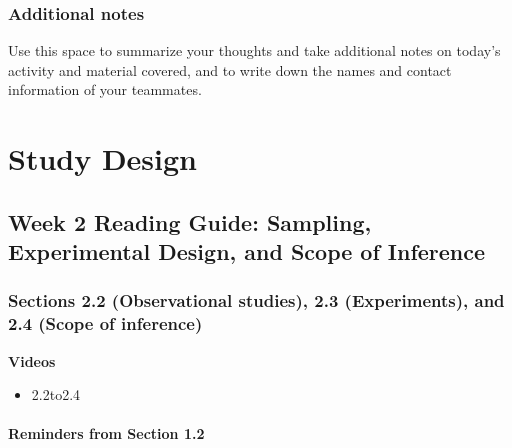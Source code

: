 \documentclass[
]{report}
\providecommand{\tightlist}{%
  \setlength{\itemsep}{0pt}\setlength{\parskip}{0pt}}
\begin{document}
\hypertarget{additional-notes}{%
\subsection{Additional notes}\label{additional-notes}}

Use this space to summarize your thoughts and take additional notes on today's activity and material covered, and to write down the names and contact information of your teammates.

\newpage

\hypertarget{study-design}{%
\chapter{Study Design}\label{study-design}}

\hypertarget{week-2-reading-guide-sampling-experimental-design-and-scope-of-inference}{%
\section{Week 2 Reading Guide: Sampling, Experimental Design, and Scope of Inference}\label{week-2-reading-guide-sampling-experimental-design-and-scope-of-inference}}

\hypertarget{sections-2.2-observational-studies-2.3-experiments-and-2.4-scope-of-inference}{%
\subsection*{Sections 2.2 (Observational studies), 2.3 (Experiments), and 2.4 (Scope of inference)}\label{sections-2.2-observational-studies-2.3-experiments-and-2.4-scope-of-inference}}


\textbf{Videos}

\begin{itemize}
\tightlist
\item
  2.2to2.4
\end{itemize}


\hypertarget{reminders-from-section-1.2}{%
\subsubsection*{Reminders from Section 1.2}\label{reminders-from-section-1.2}}
\end{document}
